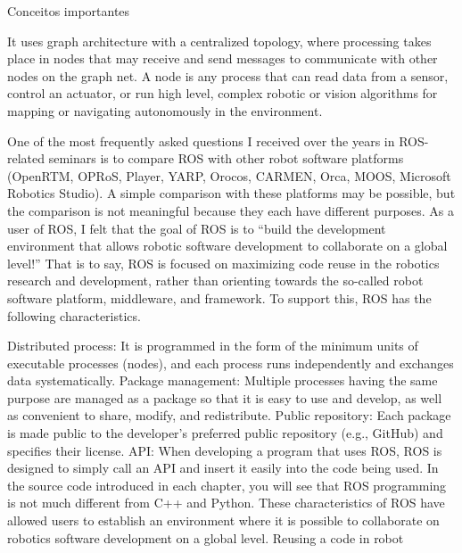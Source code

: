 Conceitos importantes

It uses graph architecture with a centralized topology, where processing takes place in nodes that may receive and send messages to communicate with other nodes on the graph net. A node is any process that can read data from a sensor, control an actuator, or run high level, complex robotic or vision algorithms for mapping or navigating autonomously in the
environment.\cite{rosEfetiveProgram}

One of the most frequently asked questions I received over the years in ROS-related seminars is to compare ROS with other robot software platforms (OpenRTM, OPRoS, Player, YARP, Orocos, CARMEN, Orca, MOOS, Microsoft Robotics Studio). A simple comparison with these platforms may be possible, but the comparison is not meaningful because they each have different purposes. As a user of ROS, I felt that the goal of ROS is to “build the development environment that allows robotic software development to collaborate on a global level!” That is to say, ROS is focused on maximizing code reuse in the robotics research and development, rather than orienting towards the so-called robot software platform, middleware, and framework. To support this, ROS has the following characteristics.


Distributed process: It is programmed in the form of the minimum units of executable processes (nodes), and each process runs independently and exchanges data systematically. Package management: Multiple processes having the same purpose are managed as a package so that it is easy to use and develop, as well as convenient to share, modify, and redistribute. Public repository: Each package is made public to the developer’s preferred public repository (e.g., GitHub) and specifies their license. API: When developing a program that uses ROS, ROS is designed to simply call an API and insert it easily into the code being used. In the source code introduced in each chapter, you will see that ROS programming is not much different from C++ and Python. These characteristics of ROS have allowed users to establish an environment where it is possible to collaborate on robotics software development on a global level. Reusing a code in robot 



